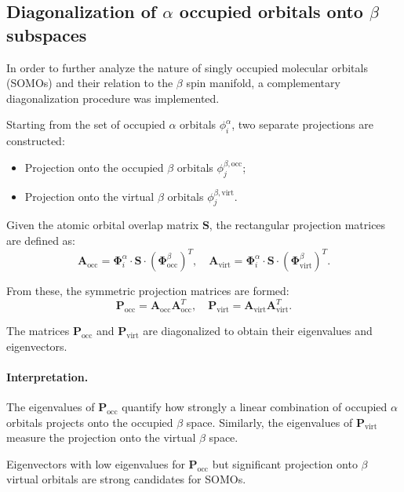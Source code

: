 \subsection{Diagonalization of \texorpdfstring{$\alpha$}{alpha} occupied orbitals onto \texorpdfstring{$\beta$}{beta} subspaces}

In order to further analyze the nature of singly occupied molecular orbitals (SOMOs) and their relation to the $\beta$ spin manifold, a complementary diagonalization procedure was implemented.

Starting from the set of occupied $\alpha$ orbitals $\phi_{i}^{\alpha}$, two separate projections are constructed:

\begin{itemize}
    \item Projection onto the occupied $\beta$ orbitals $\phi_{j}^{\beta,\text{occ}}$;
    \item Projection onto the virtual $\beta$ orbitals $\phi_{j}^{\beta,\text{virt}}$.
\end{itemize}

Given the atomic orbital overlap matrix $\boldsymbol{S}$, the rectangular projection matrices are defined as:
\[
\boldsymbol{A}_{\text{occ}} = \boldsymbol{\Phi}_{i}^{\alpha}\cdot\boldsymbol{S}\cdot(\boldsymbol{\Phi}_{\text{occ}}^{\beta})^{T},
\quad
\boldsymbol{A}_{\text{virt}} = \boldsymbol{\Phi}_{i}^{\alpha}\cdot\boldsymbol{S}\cdot(\boldsymbol{\Phi}_{\text{virt}}^{\beta})^{T}.
\]

From these, the symmetric projection matrices are formed:
\[
\boldsymbol{P}_{\text{occ}} = \boldsymbol{A}_{\text{occ}}\boldsymbol{A}_{\text{occ}}^{T},
\quad
\boldsymbol{P}_{\text{virt}} = \boldsymbol{A}_{\text{virt}}\boldsymbol{A}_{\text{virt}}^{T}.
\]

The matrices $\boldsymbol{P}_{\text{occ}}$ and $\boldsymbol{P}_{\text{virt}}$ are diagonalized to obtain their eigenvalues and eigenvectors.

\paragraph{Interpretation.}
The eigenvalues of $\boldsymbol{P}_{\text{occ}}$ quantify how strongly a linear combination of occupied $\alpha$ orbitals projects onto the occupied $\beta$ space.
Similarly, the eigenvalues of $\boldsymbol{P}_{\text{virt}}$ measure the projection onto the virtual $\beta$ space.

Eigenvectors with low eigenvalues for $\boldsymbol{P}_{\text{occ}}$ but significant projection onto $\beta$ virtual orbitals are strong candidates for SOMOs.

